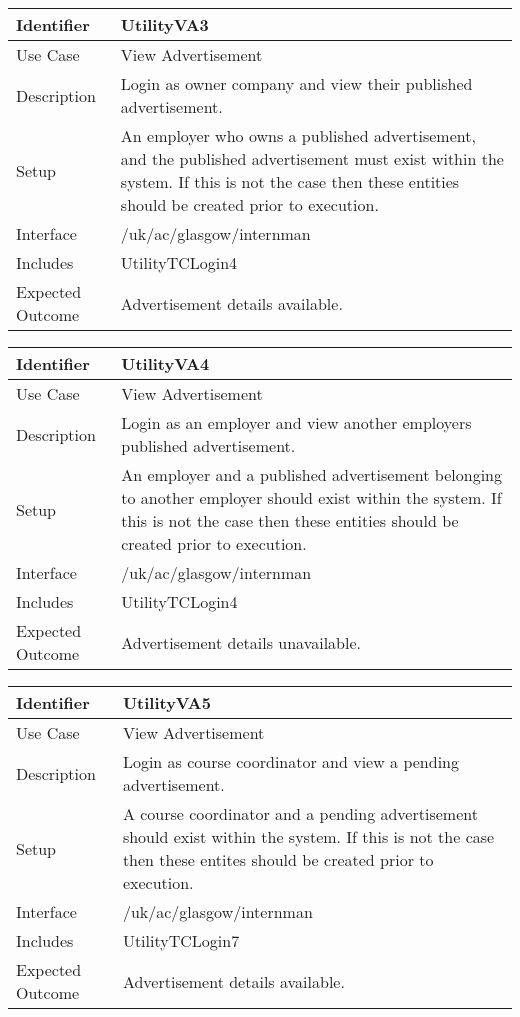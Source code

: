 \vspace{2em}

\begin{tabularx}{\textwidth}{|T|L|}
\hline
Identifier & UtilityVA3\\
\hline
Use Case & View Advertisement \\
\hline
Description & Login as owner company and view their published advertisement.\\
\hline
Setup & An employer who owns a published advertisement, and the
published advertisement must exist within the system. If this is not
the case then these entities should be created prior to execution.\\
\hline
Interface & /uk/ac/glasgow/internman \\
\hline
Includes & UtilityTCLogin4 \\
\hline
Expected Outcome & Advertisement details available.\\
\hline
\end{tabularx}

\vspace{2em}

\begin{tabularx}{\textwidth}{|T|L|}
\hline
Identifier & UtilityVA4\\
\hline
Use Case & View Advertisement \\
\hline
Description & Login as an employer and view another employers published 
advertisement.\\
\hline
Setup & An employer and a published advertisement belonging to another
employer should exist within the system. If this is not the case
then these entities should be created prior to execution.\\
\hline
Interface & /uk/ac/glasgow/internman \\
\hline
Includes & UtilityTCLogin4 \\
\hline
Expected Outcome & Advertisement details unavailable.\\
\hline
\end{tabularx}

\vspace{2em}

\begin{tabularx}{\textwidth}{|T|L|}
\hline
Identifier & UtilityVA5\\
\hline
Use Case & View Advertisement \\
\hline
Description & Login as course coordinator and view a pending advertisement.\\
\hline
Setup & A course coordinator and a pending advertisement should exist
within the system. If this is not the case then these entites should
be created prior to execution.\\
\hline
Interface & /uk/ac/glasgow/internman \\
\hline
Includes & UtilityTCLogin7\\
\hline
Expected Outcome & Advertisement details available.\\
\hline
\end{tabularx}

